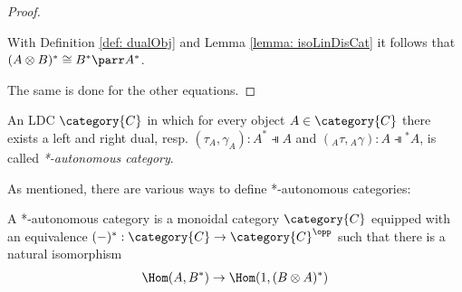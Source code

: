 \documentclass[DIN, pagenumber=false, fontsize=11pt, parskip=half, colorinlistoftodos, svgnames]{scrartcl}
\begin{document}
\begin{proof}
		\begin{center}
		\end{center}
		
		With Definition \ref{def: dualObj} and Lemma \ref{lemma: isoLinDisCat} it follows that $(A \otimes B)^* \cong B^* \parr A^* $.
		
		The same is done for the other equations.
	\end{proof}
	
	
	
	\begin{definition}
		\label{def: autoCatSrinivasan}
		An LDC $\category{C} $ in which for every object $A \in \category{C} $ there exists a left and right dual, resp. $(\tau_A, \gamma_A): A^* \dashV A $ and $({_A}\tau, {_A}\gamma): A \dashV {^*A} $, is called \emph{*-autonomous category}.
	\end{definition}
	
	As mentioned, there are various ways to define *-autonomous categories:
	
	\begin{definition}
		\label{def: autoCatBarrC}
		A *-autonomous category is a monoidal category $\category{C} $ equipped with an equivalence $(-)^* : \category{C} \rightarrow \category{C}^\opp $ such that there is a natural isomorphism 
		\begin{align*}
			\Hom(A, B^*) \rightarrow \Hom(1, (B \otimes A)^*)
		\end{align*}
	\end{definition}
	
\end{document}
